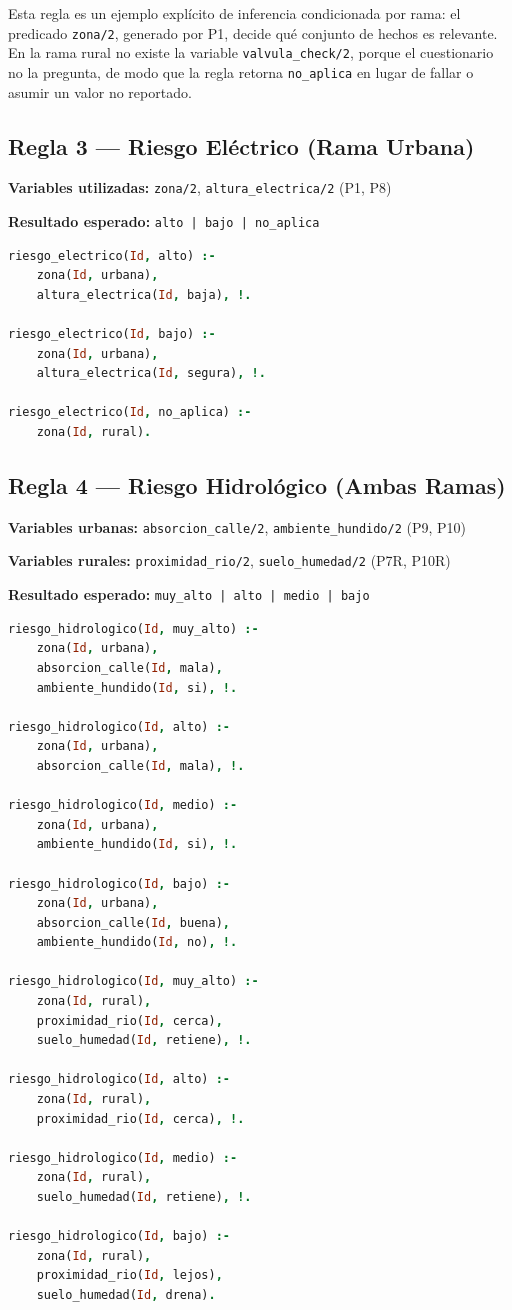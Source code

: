 \documentclass[12pt, letterpaper]{article}
\begin{document}
Esta regla es un ejemplo explícito de inferencia condicionada por rama: el predicado \texttt{zona/2}, generado por P1, decide qué conjunto de hechos es relevante. En la rama rural no existe la variable \texttt{valvula\_check/2}, porque el cuestionario no la pregunta, de modo que la regla retorna \texttt{no\_aplica} en lugar de fallar o asumir un valor no reportado.

\subsection{Regla 3 — Riesgo Eléctrico (Rama Urbana)}

\textbf{Variables utilizadas:} \texttt{zona/2}, \texttt{altura\_electrica/2} (P1, P8)

\textbf{Resultado esperado:} \texttt{alto | bajo | no\_aplica}

\begin{lstlisting}[language=Prolog, caption={Reglas de riesgo eléctrico}]
riesgo_electrico(Id, alto) :-
    zona(Id, urbana),
    altura_electrica(Id, baja), !.

riesgo_electrico(Id, bajo) :-
    zona(Id, urbana),
    altura_electrica(Id, segura), !.

riesgo_electrico(Id, no_aplica) :-
    zona(Id, rural).
\end{lstlisting}

\subsection{Regla 4 — Riesgo Hidrológico (Ambas Ramas)}

\textbf{Variables urbanas:} \texttt{absorcion\_calle/2}, \texttt{ambiente\_hundido/2} (P9, P10)

\textbf{Variables rurales:} \texttt{proximidad\_rio/2}, \texttt{suelo\_humedad/2} (P7R, P10R)

\textbf{Resultado esperado:} \texttt{muy\_alto | alto | medio | bajo}

\begin{lstlisting}[language=Prolog, caption={Reglas de riesgo hidrológico}]
riesgo_hidrologico(Id, muy_alto) :-
    zona(Id, urbana),
    absorcion_calle(Id, mala),
    ambiente_hundido(Id, si), !.

riesgo_hidrologico(Id, alto) :-
    zona(Id, urbana),
    absorcion_calle(Id, mala), !.

riesgo_hidrologico(Id, medio) :-
    zona(Id, urbana),
    ambiente_hundido(Id, si), !.

riesgo_hidrologico(Id, bajo) :-
    zona(Id, urbana),
    absorcion_calle(Id, buena),
    ambiente_hundido(Id, no), !.

riesgo_hidrologico(Id, muy_alto) :-
    zona(Id, rural),
    proximidad_rio(Id, cerca),
    suelo_humedad(Id, retiene), !.

riesgo_hidrologico(Id, alto) :-
    zona(Id, rural),
    proximidad_rio(Id, cerca), !.

riesgo_hidrologico(Id, medio) :-
    zona(Id, rural),
    suelo_humedad(Id, retiene), !.

riesgo_hidrologico(Id, bajo) :-
    zona(Id, rural),
    proximidad_rio(Id, lejos),
    suelo_humedad(Id, drena).
\end{lstlisting}
\end{document}
